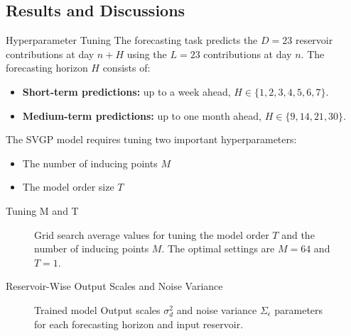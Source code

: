 \subsection{Results and Discussions}

\begin{frame}{Hyperparameter Tuning}
	\justifying
	The forecasting task predicts the $D=23$ reservoir contributions at day $n+H$ using the $L=23$ contributions at day $n$. The forecasting horizon $H$ consists of:
	
	\begin{itemize}
		\item \textbf{Short-term predictions:} up to a week ahead, $H\in\{1,2,3,4,5,6,7\}$.
		\item \textbf{Medium-term predictions:} up to one month ahead, $H\in\{9,14,21,30\}$.
	\end{itemize}
	
	The SVGP model requires tuning two important hyperparameters:
	
	\begin{itemize}
		\item The number of inducing points $M$
		\item The model order size $T$
	\end{itemize}
\end{frame}


\begin{frame}{Tuning M and T}
 	\begin{figure}[htbp]
	 	\setlength{} 
	 	\setlength{}
 		\hspace{-1em}
 		
 		\caption{Grid search average values for tuning the model order $T$ and the number of inducing points $M$. The optimal settings are $M=64$ and $T=1$.}
	\end{figure}
\end{frame}

\begin{frame}{Reservoir-Wise Output Scales and Noise Variance}
	
	\begin{figure}[htbp]
	 	\setlength{} 
		\setlength{}
		\hspace{-1em}
		\caption{Trained model Output scales $\sigma^2_d$ and noise variance $\Sigma_\epsilon$ parameters for each forecasting horizon and input reservoir.}
	\end{figure}
\end{frame}


